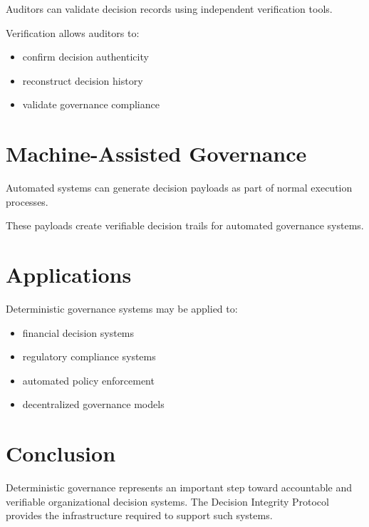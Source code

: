 \documentclass[11pt]{article}
\begin{document}
Auditors can validate decision records using independent
verification tools.

Verification allows auditors to:

\begin{itemize}
\item confirm decision authenticity
\item reconstruct decision history
\item validate governance compliance
\end{itemize}

\section{Machine-Assisted Governance}

Automated systems can generate decision payloads as part of
normal execution processes.

These payloads create verifiable decision trails for automated
governance systems.

\section{Applications}

Deterministic governance systems may be applied to:

\begin{itemize}
\item financial decision systems
\item regulatory compliance systems
\item automated policy enforcement
\item decentralized governance models
\end{itemize}

\section{Conclusion}

Deterministic governance represents an important step toward
accountable and verifiable organizational decision systems.
The Decision Integrity Protocol provides the infrastructure
required to support such systems.
\end{document}
